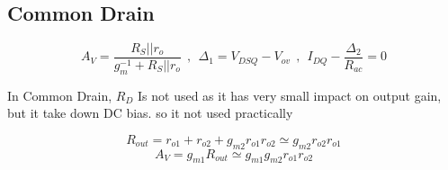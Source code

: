 ~\vspace{-3em}
\subsection{Common Drain}
$$ A_V = \dfrac{R_S || r_o}{g_m^{-1} + R_S||r_o} ~~ , ~~  {\Delta}_1 = V_{DSQ} - V_{ov} ~~ , ~~ I_{DQ} - \frac{{\Delta}_2}{R_{ac}} = 0 $$
\par
\setlength{\parindent}{0.5cm} %
In Common Drain, $R_D$ Is not used as it has very small impact on output gain, but it take down DC bias. so it not used practically
\lipsum[1-4]
\setlength{\parindent}{0.0cm} 
\begin{minipage}[b]{.5\textwidth}
$$ R_{out} = r_{o1} + r_{o2} + g_{m2} r_{o1} r_{o2} \simeq  g_{m2} r_{o2} r_{o1} $$
$$ A_V = g_{m1} R_{out} \simeq g_{m1} g_{m2} r_{o1} r_{o2}$$
\par ~\\
\centering

\end{minipage}%
\noindent
\setlength{\parindent}{0.0cm} 
\hspace*{-\parindent}%
\begin{minipage}[b]{.5\textwidth}
\raggedleft

\end{minipage}%
